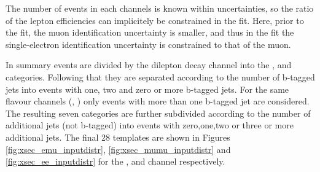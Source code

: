 The number of events in each channels is known within uncertainties, so the ratio of the lepton efficiencies can implicitely be constrained in the fit.
Here, prior to the fit, the muon identification uncertainty is smaller, and thus in the fit the single-electron identification uncertainty is constrained to that of the muon.



In summary events are divided by the dilepton decay channel into the \emu, \ee and \mumu categories. Following that they are separated according to the number of b-tagged jets into events with one, two and zero or more b-tagged jets. For the same flavour channels (\ee, \mumu) only events with more than one b-tagged jet are considered. The resulting seven categories are further subdivided according to the number of additional jets (not b-tagged) into events with zero,one,two or three or more additional jets. The final 28 templates are shown in Figures 
 \ref{fig:xsec_emu_inputdistr}, \ref{fig:xsec_mumu_inputdistr} and \ref{fig:xsec_ee_inputdistr} for the \emu, \mumu and \ee channel respectively.

